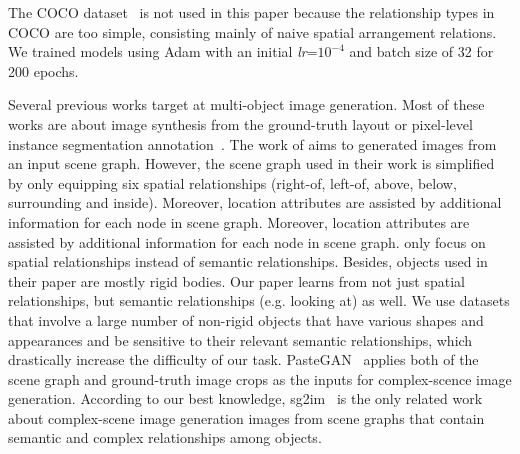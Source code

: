 The COCO dataset~\cite{caesar2018coco-stuff} is not used in this paper because the relationship types in COCO are too simple, consisting mainly of naive spatial arrangement relations. %
We trained models using Adam with an initial \textit{lr}=$10^{-4}$ and batch size of 32 for 200 epochs. %

Several previous works target at multi-object image generation. Most of these works are about image synthesis from the ground-truth layout or pixel-level instance segmentation annotation~\cite{sun2019image,hong2018inferring,li2019object}. The work of \citeauthor{ashual2019specifying} aims to generated images from an input scene graph. However, the scene graph used in their work is simplified by only equipping six spatial relationships (right-of, left-of, above, below, surrounding and inside). Moreover, location attributes are assisted by additional information for each node in scene graph. Moreover, location attributes are assisted by additional information for each node in scene graph. \citeauthor{luo2020end} only focus on spatial relationships instead of semantic relationships. Besides, objects used in their paper are mostly rigid bodies. Our paper learns from not just spatial relationships, but semantic relationships (e.g. looking at) as well. We use datasets that involve a large number of non-rigid objects that have various shapes and appearances and be sensitive to their relevant semantic relationships, which drastically increase the difficulty of our task. %
PasteGAN~\cite{yikang2019pastegan} applies both of the scene graph and ground-truth image crops as the inputs for complex-scence image generation. According to our best knowledge, sg2im~\cite{johnson2018image} is the only related work about complex-scene image generation images from scene graphs that contain semantic and complex relationships among objects. 


